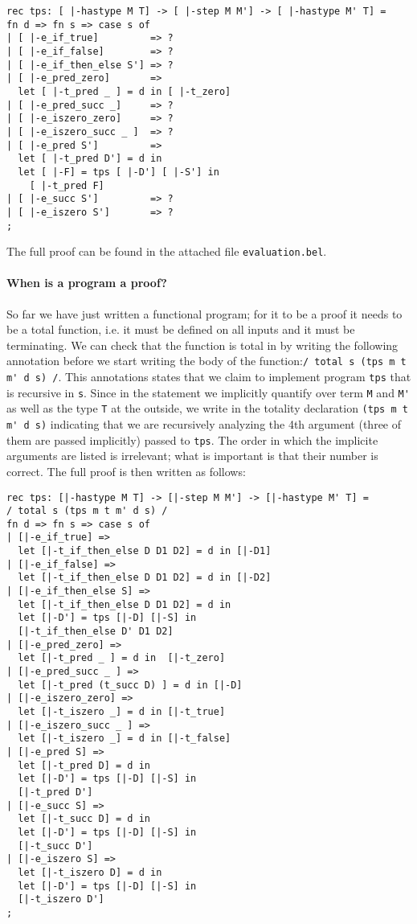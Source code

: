 \begin{lstlisting}
rec tps: [ |-hastype M T] -> [ |-step M M'] -> [ |-hastype M' T] =
fn d => fn s => case s of
| [ |-e_if_true]         => ?
| [ |-e_if_false]        => ?
| [ |-e_if_then_else S'] => ?
| [ |-e_pred_zero]       =>
  let [ |-t_pred _ ] = d in [ |-t_zero]
| [ |-e_pred_succ _]     => ?
| [ |-e_iszero_zero]     => ?
| [ |-e_iszero_succ _ ]  => ?
| [ |-e_pred S']         =>
  let [ |-t_pred D'] = d in
  let [ |-F] = tps [ |-D'] [ |-S'] in
    [ |-t_pred F]
| [ |-e_succ S']         => ?
| [ |-e_iszero S']       => ?
;
\end{lstlisting}

The full proof can be found in the attached file \lstinline!evaluation.bel!.

\paragraph{When is a program a proof?} So far we have just written a
functional program; for it to be a proof it needs to be a total
function, i.e. it must be defined on all inputs and it must be
terminating. We can check that the function is total in \beluga by
writing the following annotation before we start writing the body of
the function:\lstinline!/ total s (tps m t m' d s) /!. This
annotations states that we claim to implement program \lstinline!tps! that is
recursive in \lstinline!s!. Since in the statement we implicitly
quantify over term \lstinline!M! and \lstinline!M'! as well as the
type \lstinline!T! at the outside, we write in the totality
declaration \lstinline!(tps m t m' d s)! indicating that we are
recursively analyzing the 4th argument (three of them are passed
implicitly) passed to \lstinline!tps!. The order in which the
implicite arguments are listed is irrelevant; what is important is
that their number is correct.
The full proof is then written as follows:


\begin{lstlisting}
rec tps: [|-hastype M T] -> [|-step M M'] -> [|-hastype M' T] =
/ total s (tps m t m' d s) /
fn d => fn s => case s of
| [|-e_if_true] =>
  let [|-t_if_then_else D D1 D2] = d in [|-D1]
| [|-e_if_false] =>
  let [|-t_if_then_else D D1 D2] = d in [|-D2]
| [|-e_if_then_else S] =>
  let [|-t_if_then_else D D1 D2] = d in
  let [|-D'] = tps [|-D] [|-S] in
  [|-t_if_then_else D' D1 D2]
| [|-e_pred_zero] =>
  let [|-t_pred _ ] = d in  [|-t_zero]
| [|-e_pred_succ _ ] =>
  let [|-t_pred (t_succ D) ] = d in [|-D]
| [|-e_iszero_zero] =>
  let [|-t_iszero _] = d in [|-t_true]
| [|-e_iszero_succ _ ] =>
  let [|-t_iszero _] = d in [|-t_false]
| [|-e_pred S] =>
  let [|-t_pred D] = d in
  let [|-D'] = tps [|-D] [|-S] in
  [|-t_pred D']
| [|-e_succ S] =>
  let [|-t_succ D] = d in
  let [|-D'] = tps [|-D] [|-S] in
  [|-t_succ D']
| [|-e_iszero S] =>
  let [|-t_iszero D] = d in
  let [|-D'] = tps [|-D] [|-S] in
  [|-t_iszero D']
;
\end{lstlisting}


